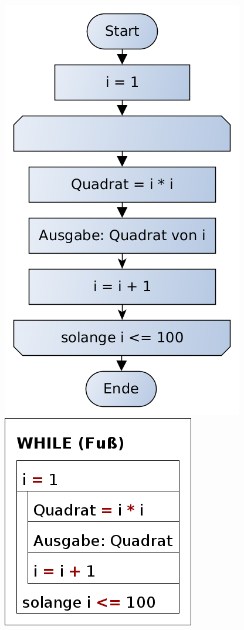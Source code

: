 \includegraphics[scale=0.4]{1jahr_pictures/lf06prog-pic/lf06prog-while-fuss-pap.png}
\includegraphics[scale=0.4]{1jahr_pictures/lf06prog-pic/lf06prog-while-fuss-struct.png}

